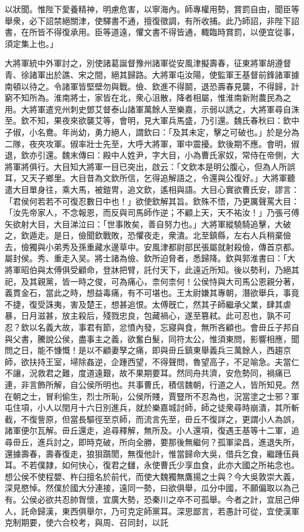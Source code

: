 \begin{pinyinscope}
以狀聞。惟陛下愛養精神，明慮危害，以寧海內。師專權用勢，賞罰自由，聞臣等舉衆，必下詔禁絕關津，使驛書不通，擅復徵調，有所收捕。此乃師詔，非陛下詔書，在所皆不得復承用。臣等道遠，懼文書不得皆通，輙臨時賞罰，以便宜從事，須定集上也。」

大將軍統中外軍討之，別使諸葛誕督豫州諸軍從安風津擬壽春，征東將軍胡遵督青、徐諸軍出於譙、宋之間，絕其歸路。大將軍屯汝陽，使監軍王基督前鋒諸軍據南頓以待之。令諸軍皆堅壁勿與戰。儉、欽進不得鬬，退恐壽春見襲，不得歸，計窮不知所為。淮南將士，家皆在北，衆心沮散，降者相屬，惟淮南新附農民為之用。大將軍遣兖州刺史鄧艾督泰山諸軍萬餘人至樂嘉，示弱以誘之，大將軍尋自洙至。欽不知，果夜來欲襲艾等，會明，見大軍兵馬盛，乃引還。魏氏春秋曰：欽中子俶，小名鴦。年尚幼，勇力絕人，謂欽曰：「及其未定，擊之可破也。」於是分為二隊，夜夾攻軍。俶率壯士先至，大呼大將軍，軍中震擾。欽後期不應。會明，俶退，欽亦引還。魏末傳曰：殿中人姓尹，字大目，小為曹氏家奴，常侍在帝側，大將軍將俱行。大目知大將軍一目已突出，啟云：「文欽本是明公腹心，但為人所誤耳，又天子鄉里。大目昔為文欽所信，乞得追解語之，令還與公復好。」大將軍聽遣大目單身往，乘大馬，被鎧冑，追文欽，遙相與語。大目心實欲曹氏安，謬言：「君侯何若若不可復忍數日中也！」欲使欽解其旨。欽殊不悟，乃更厲聲罵大目：「汝先帝家人，不念報恩，而反與司馬師作逆；不顧上天，天不祐汝！」乃張弓傅矢欲射大目，大目涕泣曰：「世事敗矣，善自努力也。」大將軍縱驍騎追擊，大破之，欽遁走。是日，儉聞欽戰敗，恐懼夜走，衆潰。北至鎮縣，左右人兵稍棄儉去，儉獨與小弟秀及孫重藏水邊草中。安風津都尉部民張屬就射殺儉，傳首京都。屬封侯。秀、重走入吴。將士諸為儉、欽所迫脅者，悉歸降。欽與郭淮書曰：「大將軍昭伯與太傅俱受顧命，登牀把臂，託付天下，此遠近所知。後以勢利，乃絕其祀，及其親黨，皆一時之俊，可為痛心，柰何柰何！公侯恃與大司馬公恩親分著，義貫金石，當此之時，想益毒痛，有不可堪也。王太尉嫌其專朝，潛欲舉兵，事竟不捷，復受誅夷，害及楚王，想甚追恨。太傅旣亡，然其子師繼承父業，肆其虐暴，日月滋甚，放主殺后，殘戮忠良，包藏禍心，遂至篡弒。此可忍也，孰不可忍？欽以名義大故，事君有節，忿憤內發，忘寢與食，無所吝顧也。會毌丘子邦自與父書，騰說公侯，盡事主之義，欲奮白髮，同符太公，惟須東問，影響相應，聞問之日，能不慷慨！是以不顧妻孥之痛，即與毌丘鎮東舉義兵三萬餘人，西趨京師，欲扶持王室，埽除姦逆，企踵西望，不得聲問，魯望高子，不足喻急。夫當仁不讓，況救君之難，度道遠艱，故不果期要耳。然同舟共濟，安危勢同，禍痛已連，非言飾所解，自公侯所明也。共事曹氏，積信魏朝，行道之人，皆所知見。然在朝之士，冒利偷生，烈士所恥，公侯所賤，賈豎所不忍為也，況當塗之士邪？軍屯住項，小人以閏月十六日別進兵，就於樂嘉城討師，師之徒衆尋時崩潰，其所斬截，不復訾原，但當長驅徑至京師，而流言先至，毌丘不復詳之，更謂小人為誤，諸軍便尔瓦解。毌丘還走，追尋釋解，無所及。小人還項，復遇王基等十二軍，追尋毌丘，進兵討之，即時克破，所向全勝，要那後無繼何？孤軍梁昌，進退失所，還據壽春，壽春復走，狼狽躓閡，無復他計，惟當歸命大吳，借兵乞食，繼踵伍員耳。不若僕隷，如何快心，復君之讎，永使曹氏少享血食，此亦大國之所祐念也。想公侯不使程嬰、杵臼擅名於前代，而使大魏獨無鷹揚之士與？今大吳敦崇大義，深見愍悼。然僕於國大分連接，遠同一勢，曰欲俱舉，瓜分中國，不願偏取以為己有。公侯必欲共忍帥胷懷，宜廣大勢，恐秦川之卒不可孤舉。今者之計，宜屈己伸人，託命歸漢，東西俱舉尔，乃可克定師黨耳。深思鄙言，若愚計可從，宜使漢軍克制期要，使六合校考，與周、召同封，以託
\end{pinyinscope}
